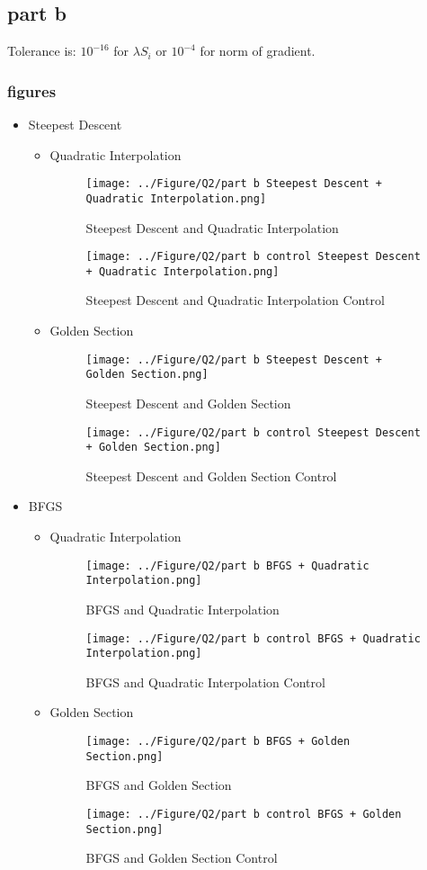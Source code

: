 \subsection{part b}
Tolerance is: $10^{-16}$ for $\lambda  S_i$ or $10^{-4}$ for norm of gradient.
\subsubsection{figures}
\newpage
\begin{itemize}
	\item Steepest Descent
	\begin{itemize}
		\item Quadratic Interpolation
		\begin{figure}[H]
			\caption{Steepest Descent and Quadratic Interpolation}
			\centering
			\texttt{[image: ../Figure/Q2/part b Steepest Descent + Quadratic Interpolation.png]}
		\end{figure}
		\begin{figure}[H]
			\caption{Steepest Descent and Quadratic Interpolation Control}
			\centering
			\texttt{[image: ../Figure/Q2/part b control Steepest Descent + Quadratic Interpolation.png]}
		\end{figure}
		\item Golden Section
		\begin{figure}[H]
			\caption{Steepest Descent and Golden Section}
			\centering
			\texttt{[image: ../Figure/Q2/part b Steepest Descent + Golden Section.png]}
		\end{figure}
		\begin{figure}[H]
			\caption{Steepest Descent and Golden Section Control}
			\centering
			\texttt{[image: ../Figure/Q2/part b control Steepest Descent + Golden Section.png]}
		\end{figure}
	\end{itemize}
	\item BFGS
	\begin{itemize}
		\item Quadratic Interpolation
		\begin{figure}[H]
			\caption{BFGS and Quadratic Interpolation}
			\centering
			\texttt{[image: ../Figure/Q2/part b BFGS + Quadratic Interpolation.png]}
		\end{figure}
			\begin{figure}[H]
		\caption{BFGS and Quadratic Interpolation Control}
		\centering
		\texttt{[image: ../Figure/Q2/part b control BFGS + Quadratic Interpolation.png]}
	\end{figure}
		\item Golden Section
		\begin{figure}[H]
			\caption{BFGS and Golden Section}
			\centering
			\texttt{[image: ../Figure/Q2/part b BFGS + Golden Section.png]}
		\end{figure}
			\begin{figure}[H]
		\caption{BFGS and Golden Section Control}
		\centering
		\texttt{[image: ../Figure/Q2/part b control BFGS + Golden Section.png]}
	\end{figure}
	\end{itemize}
\end{itemize}
